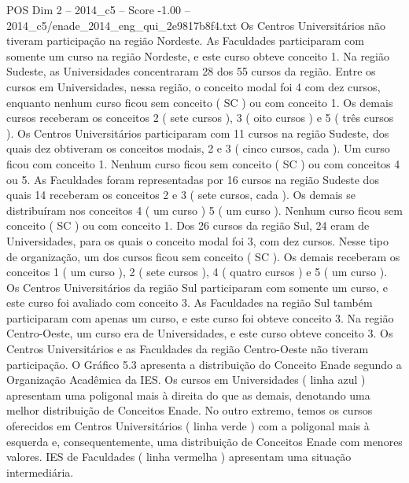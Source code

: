 \begin{textsample}{POS Dim 2 – 2014\_c5 – Score -1.00 – 2014\_c5/enade\_2014\_eng\_qui\_2e9817b8f4.txt}
Os Centros Universitários não tiveram participação na região Nordeste.
As Faculdades participaram com somente um curso na região Nordeste, e este curso obteve conceito 1.
Na região Sudeste, as Universidades concentraram 28 dos 55 cursos da região.
Entre os cursos em Universidades, nessa região, o conceito modal foi 4 com dez cursos, enquanto nenhum curso ficou sem conceito ( SC ) ou com conceito 1.
Os demais cursos receberam os conceitos 2 ( sete cursos ), 3 ( oito cursos ) e 5 ( três cursos ).
Os Centros Universitários participaram com 11 cursos na região Sudeste, dos quais dez obtiveram os conceitos modais, 2 e 3 ( cinco cursos, cada ).
Um curso ficou com conceito 1.
Nenhum curso ficou sem conceito ( SC ) ou com conceitos 4 ou 5.
As Faculdades foram representadas por 16 cursos na região Sudeste dos quais 14 receberam os conceitos 2 e 3 ( sete cursos, cada ).
Os demais se distribuíram nos conceitos 4 ( um curso ) 5 ( um curso ).
Nenhum curso ficou sem conceito ( SC ) ou com conceito 1.
Dos 26 cursos da região Sul, 24 eram de Universidades, para os quais o conceito modal foi 3, com dez cursos.
Nesse tipo de organização, um dos cursos ficou sem conceito ( SC ).
Os demais receberam os conceitos 1 ( um curso ), 2 ( sete cursos ), 4 ( quatro cursos ) e 5 ( um curso ).
Os Centros Universitários da região Sul participaram com somente um curso, e este curso foi avaliado com conceito 3.
As Faculdades na região Sul também participaram com apenas um curso, e este curso foi obteve conceito 3.
Na região Centro-Oeste, um curso era de Universidades, e este curso obteve conceito 3.
Os Centros Universitários e as Faculdades da região Centro-Oeste não tiveram participação.
O Gráfico 5.3 apresenta a distribuição do Conceito Enade segundo a Organização Acadêmica da IES.
Os cursos em Universidades ( linha azul ) apresentam uma poligonal mais à direita do que as demais, denotando uma melhor distribuição de Conceitos Enade.
No outro extremo, temos os cursos oferecidos em Centros Universitários ( linha verde ) com a poligonal mais à esquerda e, consequentemente, uma distribuição de Conceitos Enade com menores valores.
IES de Faculdades ( linha vermelha ) apresentam uma situação intermediária.

\end{textsample}
